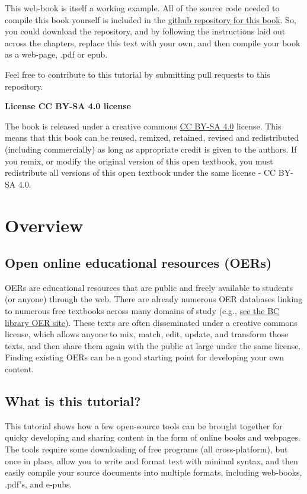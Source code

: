 \documentclass[]{book}
\theoremstyle{definition}
\theoremstyle{definition}
\theoremstyle{definition}
\theoremstyle{remark}
\begin{document}
This web-book is itself a working example. All of the source code needed
to compile this book yourself is included in the
\href{https://github.com/CrumpLab/OER_bookdown}{github repository for
this book}. So, you could download the repository, and by following the
instructions laid out across the chapters, replace this text with your
own, and then compile your book as a web-page, .pdf or epub.

Feel free to contribute to this tutorial by submitting pull requests to
this repository.

\textbf{License CC BY-SA 4.0 license}

The book is released under a creative commons
\href{https://creativecommons.org/licenses/by-sa/4.0/}{CC BY-SA 4.0}
license. This means that this book can be reused, remixed, retained,
revised and redistributed (including commercially) as long as
appropriate credit is given to the authors. If you remix, or modify the
original version of this open textbook, you must redistribute all
versions of this open textbook under the same license - CC BY-SA 4.0.

\chapter{Overview}\label{overview}

\section{Open online educational resources
(OERs)}\label{open-online-educational-resources-oers}

OERs are educational resources that are public and freely available to
students (or anyone) through the web. There are already numerous OER
databases linking to numerous free textbooks across many domains of
study (e.g., \href{http://libguides.brooklyn.cuny.edu/research/oer}{see
the BC library OER site}). These texts are often disseminated under a
creative commons license, which allows anyone to mix, match, edit,
update, and transform those texts, and then share them again with the
public at large under the same license. Finding existing OERs can be a
good starting point for developing your own content.

\section{What is this tutorial?}\label{what-is-this-tutorial}

This tutorial shows how a few open-source tools can be brought together
for quicky developing and sharing content in the form of online books
and webpages. The tools require some downloading of free programs (all
cross-platform), but once in place, allow you to write and format text
with minimal syntax, and then easily compile your source documents into
multiple formats, including web-books, .pdf's, and e-pubs.
\end{document}
